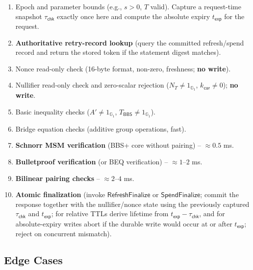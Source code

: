 \documentclass[11pt]{article}
\theoremstyle{definitionstyle}
\theoremstyle{plain}
\begin{document}
\begin{enumerate}[leftmargin=*]
\item Epoch and parameter bounds (e.g., $s > 0$, $T$ valid). Capture a request-time snapshot $\tau_{\mathsf{chk}}$ exactly once here and compute the absolute expiry $t_{\mathsf{exp}}$ for the request.
\item \textbf{Authoritative retry-record lookup} (query the committed refresh/spend record and return the stored token if the statement digest matches).
\item Nonce read-only check (16-byte format, non-zero, freshness; \textbf{no write}).
\item Nullifier read-only check and zero-scalar rejection ($N_T \neq 1_{\mathbb{G}_1}$, $k_{\mathsf{cur}} \neq 0$); \textbf{no write}.
\item Basic inequality checks ($A' \neq 1_{\mathbb{G}_1}$, $T_{\mathsf{BBS}} \neq 1_{\mathbb{G}_1}$).
\item Bridge equation checks (additive group operations, fast).
\item \textbf{Schnorr MSM verification} (BBS+ core without pairing) – $\approx 0.5$ ms.
\item \textbf{Bulletproof verification} (or BEQ verification) – $\approx 1$--$2$ ms.
\item \textbf{Bilinear pairing checks} – $\approx 2$--$4$ ms.
\item \textbf{Atomic finalization} (invoke $\mathsf{RefreshFinalize}$ or $\mathsf{SpendFinalize}$; commit the response together with the nullifier/nonce state using the previously captured $\tau_{\mathsf{chk}}$ and $t_{\mathsf{exp}}$; for relative TTLs derive lifetime from $t_{\mathsf{exp}}-\tau_{\mathsf{chk}}$, and for absolute-expiry writes abort if the durable write would occur at or after $t_{\mathsf{exp}}$; reject on concurrent mismatch).
\end{enumerate}

\subsection{Edge Cases}
\end{document}
